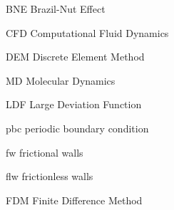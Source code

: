 
\begin{siglas}
    \item[BNE] Brazil-Nut Effect
    \item[CFD] Computational Fluid Dynamics
    \item[DEM] Discrete Element Method
    \item[MD] Molecular Dynamics
    \item[LDF] Large Deviation Function
    \item[pbc] periodic boundary condition
    \item[fw] frictional walls
    \item[flw] frictionless walls
    \item[FDM] Finite Difference Method
\end{siglas}

